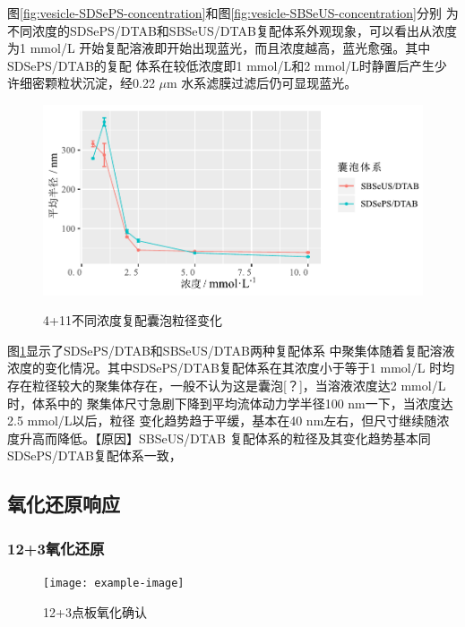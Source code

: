 \documentclass[bachelor,fandolfonts,replaceperiod]{jnuthesis}
\begin{document}
    图\ref{fig:vesicle-SDSePS-concentration}和图\ref{fig:vesicle-SBSeUS-concentration}分别
    为不同浓度的SDSePS/DTAB和SBSeUS/DTAB复配体系外观现象，可以看出从浓度为1 mmol/L
    开始复配溶液即开始出现蓝光，而且浓度越高，蓝光愈强。其中SDSePS/DTAB的复配
    体系在较低浓度即1 mmol/L和2 mmol/L时静置后产生少许细密颗粒状沉淀，经0.22 $\mu$m
    水系滤膜过滤后仍可显现蓝光。
    
    \begin{figure}[htbp]
        \centering
        \includegraphics[width=.825\textwidth]{Figure/vesicle-concentration-line.pdf}\\
        \caption{4+11不同浓度复配囊泡粒径变化}\label{fig:vesicle-concentration-line}
    \end{figure}
    
    图\ref{fig:vesicle-concentration-line}显示了SDSePS/DTAB和SBSeUS/DTAB两种复配体系
    中聚集体随着复配溶液浓度的变化情况。其中SDSePS/DTAB复配体系在其浓度小于等于1 mmol/L
    时均存在粒径较大的聚集体存在，一般不认为这是囊泡[？]，当溶液浓度达2 mmol/L时，体系中的
    聚集体尺寸急剧下降到平均流体动力学半径100 nm一下，当浓度达2.5 mmol/L以后，粒径
    变化趋势趋于平缓，基本在40 nm左右，但尺寸继续随浓度升高而降低。【原因】SBSeUS/DTAB
    复配体系的粒径及其变化趋势基本同SDSePS/DTAB复配体系一致，
    

    \subsection{氧化还原响应}
    \subsubsection{12+3氧化还原}
    \begin{figure}[htbp]
        \centering
        \texttt{[image: example-image]}\\
        \caption{12+3点板氧化确认}\label{fig:}
    \end{figure}
    
\end{document}
